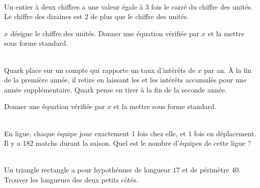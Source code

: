 \documentclass[main.tex]{subfiles}
\begin{document}
\begin{exercise}\label{chapter03:exercise:modelisation04} \hfill \\
Un entier à deux chiffres a une valeur égale à 3 fois le carré du chiffre des unités. Le chiffre des dizaines est 2 de plus que le chiffre des unités.
	
$x$ désigne le chiffre des unités. Donner une équation vérifiée par $x$ et la mettre sous forme standard.
\end{exercise}
\begin{exercise}\label{chapter03:exercise:modelisation05}  \hfill \\
	Quark place  sur un compte qui rapporte un taux d'intérêts de $x$ par an. À la fin de la première année, il retire  en laissant les  et les intérêts accumulés pour une année supplémentaire. Quark pense en tirer  à la fin de la seconde année.
	
Donner une équation vérifiée par $x$ et la mettre sous forme standard.
\end{exercise}
\begin{exercise} \label{chapter03:exercise:modelisation06} \hfill \\
En ligue, chaque équipe joue exactement 1 fois chez elle, et 1 fois en déplacement. Il y a 182 matchs durant la saison. Quel est le nombre d'équipes de cette ligue ?
\end{exercise} 
\begin{exercise}\label{chapter03:exercise:modelisation07}  \hfill \\
	 Un triangle rectangle a pour hypothénuse de longueur $17$ et de périmètre $40$. Trouver les longueurs des deux petits côtés. 
\end{exercise} 
\end{document}
